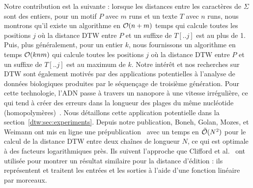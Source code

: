 Notre contribution est la suivante : lorsque les distances entre les caractères de $\Sigma$ sont des entiers, pour un motif $P$ avec $m$ runs et un texte $T$ avec $n$ runs, nous montrons qu'il existe un algorithme en $\mathcal{O}(n+m)$ temps qui calcule toutes les positions $j$ où la distance DTW entre $P$ et un suffixe de $T[..j]$ est au plus de 1. Puis, plus généralement, pour un entier $k$, nous fournissons un algorithme en temps $\mathcal{O}(knm)$ qui calcule toutes les positions $j$ où la distance DTW entre $P$ et un suffixe de $T[..j]$ est au maximum de $k$.
Notre intérêt et nos recherches sur DTW sont également motivés par des applications potentielles à l'analyse de données biologiques produites par le séquençage de troisième génération. Pour cette technologie,  l'ADN passe à travers un nanopore à une vitesse irrégulière, ce qui tend à créer des erreurs dans la longueur des plages du même nucléotide (homopolymères)~\cite{delahaye2021sequencing}. Nous détaillons cette application potentielle dans la section~\ref{dtw:sec:experiments}.
Depuis notre publication, Boneh, Golan, Mozes, et Weimann ont mis en ligne une prépublication~\cite{boneh2023near} avec un temps en $\tilde{\mathcal{O}}(N^2)$ pour le calcul de la distance DTW entre deux chaînes de longueur $N$, ce qui est optimale à des facteurs logarithmiques près. Ils suivent l'approche que Clifford et al.~\cite{clifford2019rle} ont utilisée pour montrer un résultat similaire pour la distance d'édition : ils représentent et traitent les entrées et les sorties à l'aide d'une fonction linéaire par morceaux.\\

